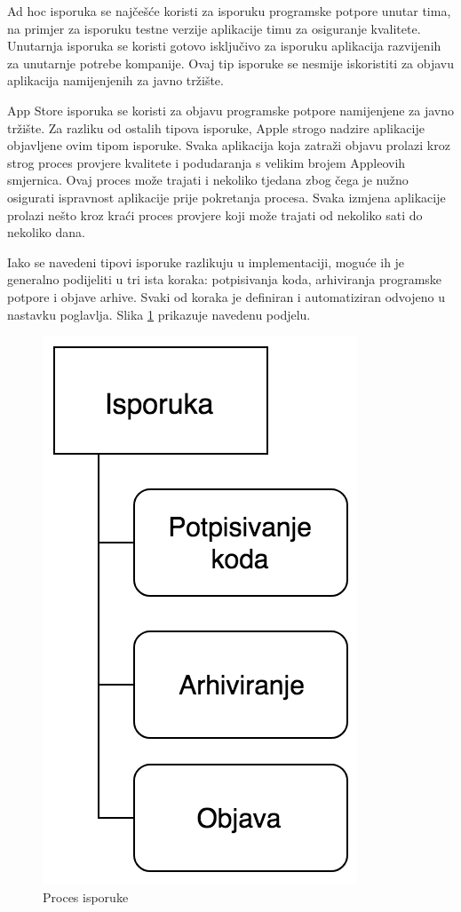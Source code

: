 \documentclass[times, utf8, diplomski, numeric]{fer}
\begin{document}
Ad hoc isporuka se najčešće koristi za isporuku programske potpore unutar tima, na primjer za isporuku testne verzije aplikacije timu za osiguranje kvalitete. Unutarnja isporuka se koristi gotovo isključivo za isporuku aplikacija razvijenih za unutarnje potrebe kompanije. Ovaj tip isporuke se nesmije iskoristiti za objavu aplikacija namijenjenih za javno tržište.

App Store isporuka se koristi za objavu programske potpore namijenjene za javno tržište. Za razliku od ostalih tipova isporuke, Apple strogo nadzire aplikacije objavljene ovim tipom isporuke. Svaka aplikacija koja zatraži objavu prolazi kroz strog proces provjere kvalitete i podudaranja s velikim brojem Appleovih smjernica. Ovaj proces može trajati i nekoliko tjedana zbog čega je nužno osigurati ispravnost aplikacije prije pokretanja procesa. Svaka izmjena aplikacije prolazi nešto kroz kraći proces provjere koji može trajati od nekoliko sati do nekoliko dana.

Iako se navedeni tipovi isporuke razlikuju u implementaciji, moguće ih je generalno podijeliti u tri ista koraka: potpisivanja koda, arhiviranja programske potpore i objave arhive. Svaki od koraka je definiran i automatiziran odvojeno u nastavku poglavlja. Slika \ref{fig:ContinuousDelivery} prikazuje navedenu podjelu.

\begin{figure}
\centering
\includegraphics[scale=0.6]{ContinuousDelivery}
\caption{Proces isporuke}
\label{fig:ContinuousDelivery}
\end{figure}
\end{document}
